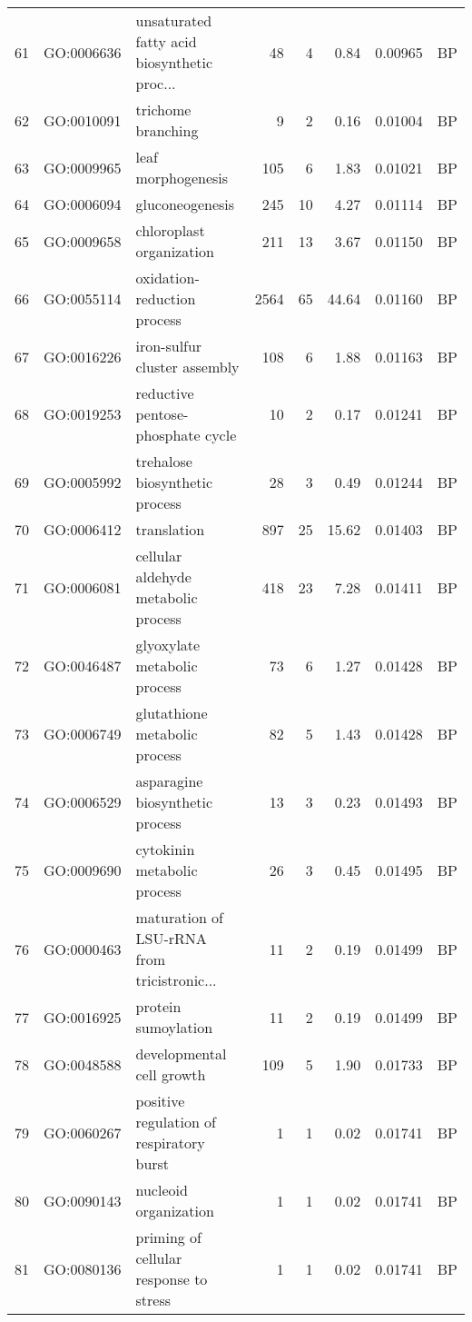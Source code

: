 \documentclass[12pt,oneside,a4paper]{article}
\begin{document}
\begin{longtable}{rllrrrll}
  61 & GO:0006636 & unsaturated fatty acid biosynthetic proc... &  48 &   4 & 0.84 & 0.00965 & BP \\ 
  62 & GO:0010091 & trichome branching &   9 &   2 & 0.16 & 0.01004 & BP \\ 
  63 & GO:0009965 & leaf morphogenesis & 105 &   6 & 1.83 & 0.01021 & BP \\ 
  64 & GO:0006094 & gluconeogenesis & 245 &  10 & 4.27 & 0.01114 & BP \\ 
  65 & GO:0009658 & chloroplast organization & 211 &  13 & 3.67 & 0.01150 & BP \\ 
  66 & GO:0055114 & oxidation-reduction process & 2564 &  65 & 44.64 & 0.01160 & BP \\ 
  67 & GO:0016226 & iron-sulfur cluster assembly & 108 &   6 & 1.88 & 0.01163 & BP \\ 
  68 & GO:0019253 & reductive pentose-phosphate cycle &  10 &   2 & 0.17 & 0.01241 & BP \\ 
  69 & GO:0005992 & trehalose biosynthetic process &  28 &   3 & 0.49 & 0.01244 & BP \\ 
  70 & GO:0006412 & translation & 897 &  25 & 15.62 & 0.01403 & BP \\ 
  71 & GO:0006081 & cellular aldehyde metabolic process & 418 &  23 & 7.28 & 0.01411 & BP \\ 
  72 & GO:0046487 & glyoxylate metabolic process &  73 &   6 & 1.27 & 0.01428 & BP \\ 
  73 & GO:0006749 & glutathione metabolic process &  82 &   5 & 1.43 & 0.01428 & BP \\ 
  74 & GO:0006529 & asparagine biosynthetic process &  13 &   3 & 0.23 & 0.01493 & BP \\ 
  75 & GO:0009690 & cytokinin metabolic process &  26 &   3 & 0.45 & 0.01495 & BP \\ 
  76 & GO:0000463 & maturation of LSU-rRNA from tricistronic... &  11 &   2 & 0.19 & 0.01499 & BP \\ 
  77 & GO:0016925 & protein sumoylation &  11 &   2 & 0.19 & 0.01499 & BP \\ 
  78 & GO:0048588 & developmental cell growth & 109 &   5 & 1.90 & 0.01733 & BP \\ 
  79 & GO:0060267 & positive regulation of respiratory burst &   1 &   1 & 0.02 & 0.01741 & BP \\ 
  80 & GO:0090143 & nucleoid organization &   1 &   1 & 0.02 & 0.01741 & BP \\ 
  81 & GO:0080136 & priming of cellular response to stress &   1 &   1 & 0.02 & 0.01741 & BP \\ 

\end{longtable}
\end{document}

